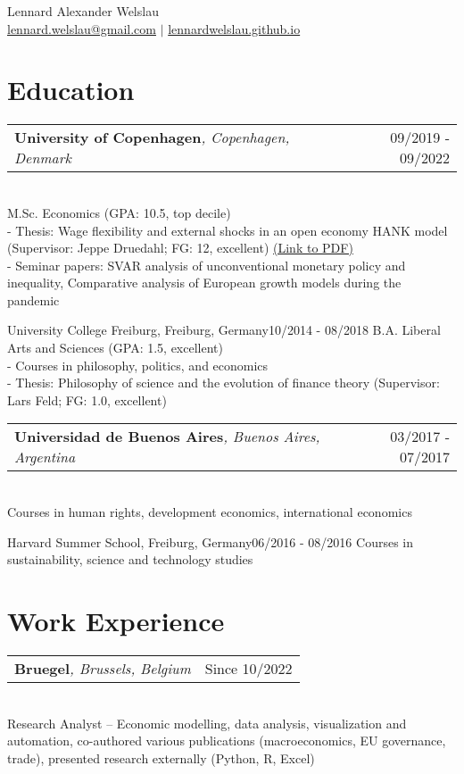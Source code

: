 \documentclass[A4,11pt]{article}
\makeatletter
\newcommand{\Subheading}[5]{   
    \begin{tabular*}{0.97\textwidth}[t]{l@{\extracolsep{\fill}}r}
      \textbf{#1}\textit{\small #2} & \small #3 
      \end{tabular*} \\
      \small #4 \\
    \vspace{7pt}
    }
\makeatother
\begin{document}
\begin{center}
    {\Large Lennard Alexander Welslau} \\ 
    \href{mailto:lennard.welslau@gmail.com}{lennard.welslau@gmail.com} $|$ \href{https://lennardwelslau.github.io/}{lennardwelslau.github.io}

\end{center}


\section{Education}
    \Subheading
        {University of Copenhagen}{, Copenhagen, Denmark}{09/2019 - 09/2022}
        {M.Sc. Economics (GPA: 10.5, top decile) \\
        - Thesis: Wage flexibility and external shocks in an open economy HANK model (Supervisor: Jeppe Druedahl; FG: 12, excellent) \href{https://lennardwelslau.github.io/research/Welslau_MA_Thesis_2022_Wage_Flexibility_Open_Economy_HANK.pdf}{(Link to PDF)}\\
        - Seminar papers: SVAR analysis of unconventional monetary policy and inequality, Comparative analysis of European growth models during the pandemic}

    \Subheading
        {University College Freiburg}{, Freiburg, Germany}{10/2014 - 08/2018}
        {B.A. Liberal Arts and Sciences (GPA: 1.5, excellent) \\
        - Courses in philosophy, politics, and economics \\
        - Thesis: Philosophy of science and the evolution of finance theory (Supervisor: Lars Feld; FG: 1.0, excellent)}

    \Subheading
        {Universidad de Buenos Aires}{, Buenos Aires, Argentina}{03/2017 - 07/2017}
        {Courses in human rights, development economics, international economics}

    \Subheading
        {Harvard Summer School}{, Freiburg, Germany}{06/2016 - 08/2016}
        {Courses in sustainability, science and technology studies}

\section{Work Experience}
    \Subheading
        {Bruegel}{, Brussels, Belgium}{Since 10/2022}
        {Research Analyst -- Economic modelling, data analysis, visualization and automation, co-authored various publications (macroeconomics, EU governance, trade), presented research externally (Python, R, Excel)}{}
\end{document}
